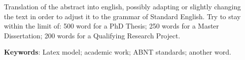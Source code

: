 
\begin{resumo}[Abstract]
    Translation of the abstract into english, possibly adapting or slightly changing the text in order to adjust it to the grammar of Standard English.
    Try to stay within the limit of: 500 word for a PhD Thesis;
    250 words for a Master Dissertation;
    200 words for a Qualifying Research Project.

    \textbf{Keywords}: Latex model; academic work; ABNT standards; another word.
\end{resumo}

